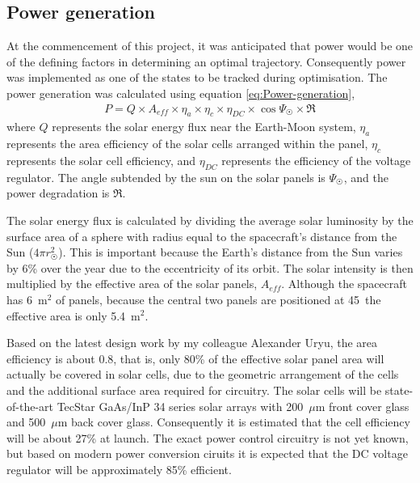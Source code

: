 \subsection{Power generation} \label{sub:Power-generation}

At the commencement of this project, it was anticipated that power would be one of the defining factors in determining an optimal trajectory. Consequently power was implemented as one of the states to be tracked during optimisation. The power generation was calculated using equation \eqref{eq:Power-generation},
\begin{gather} \label{eq:Power-generation}
P = Q\times A_{eff}\times\eta_a\times\eta_c\times\eta_{DC}\times\cos\Psi_\Sun\times\mathfrak{R}
\end{gather}
where $Q$ represents the solar energy flux near the Earth-Moon system, $\eta_a$ represents the area efficiency of the solar cells arranged within the panel, $\eta_c$ represents the solar cell efficiency, and $\eta_{DC}$ represents the efficiency of the voltage regulator. The angle subtended by the sun on the solar panels is $\Psi_\Sun$, and the power degradation is $\mathfrak{R}$.

The solar energy flux is calculated by dividing the average solar luminosity \parencite[$3.846\times10^{26}$ W,][]{Montenbruck2000} by the surface area of a sphere with radius equal to the spacecraft's distance from the Sun ($4\pi r_\Sun^2$). This is important because the Earth's distance from the Sun varies by 6\% over the year \parencite{Montenbruck2000} due to the eccentricity of its orbit. The solar intensity is then multiplied by the effective area of the solar panels, $A_{eff}$. Although the spacecraft has 6~m$^2$ of panels, because the central two panels are positioned at 45\degrees\ the effective area is only 5.4~m$^2$.

Based on the latest design work by my colleague Alexander Uryu, the area efficiency is about 0.8, that is, only 80\% of the effective solar panel area will actually be covered in solar cells, due to the geometric arrangement of the cells and the additional surface area required for circuitry. The solar cells will be state-of-the-art TecStar GaAs/InP 34 series solar arrays with 200~$\mu$m front cover glass and 500~$\mu$m back cover glass. Consequently it is estimated that the cell efficiency will be about 27\% at launch. The exact power control circuitry is not yet known, but based on modern power conversion ciruits it is expected that the DC voltage regulator will be approximately 85\% efficient. 


